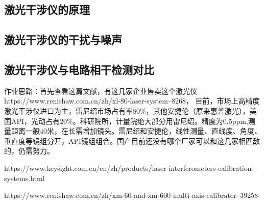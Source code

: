 \documentclass[11pt]{article}
\begin{document}
\subsection{激光干涉仪的原理}

\subsection{激光干涉仪的干扰与噪声}

\subsection{激光干涉仪与电路相干检测对比}
作业思路：首先查看这篇文献\cite{HKJC202301007}，有这几家企业售卖这个激光仪https://www.renishaw.com.cn/zh/xl-80-laser-system--8268，
目前，市场上高精度激光干涉仪进口为主，雷尼绍市场占有率80\%，其他安捷伦（原来惠普激光），美国API，光动占有20\%。科研院所，计量院绝大部分用雷尼绍。精度为0.5ppm,测量距离一般40米，在长需增加镜头。雷尼绍和安捷伦，线性测量、直线度、角度、垂直度等镜组分开，API镜组组合。国产目前还没有哪个厂家可以和这几家相匹敌的，仍需努力。

https://www.keysight.com.cn/cn/zh/products/laser-interferometers-calibration-systems.html\par
https://www.renishaw.com.cn/zh/xm-60-and-xm-600-multi-axis-calibrator--39258
\newpage
\printbibliography[heading=bibliography,title=参考文献]
\end{document}

